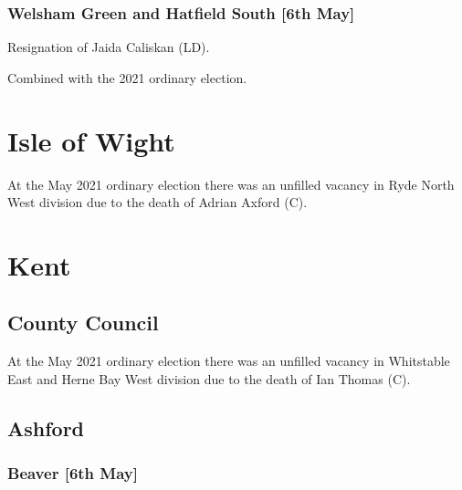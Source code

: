 \documentclass[a4paper,openany]{book}
\begin{document}
\begin{resultsiii}
\subsubsection*{Welsham Green and Hatfield South \hspace*{\fill}\nolinebreak[1]%
	\enspace\hspace*{\fill}
	[6th May]}


Resignation of Jaida Caliskan (LD).

Combined with the 2021 ordinary election.

\section{Isle of Wight}

At the May 2021 ordinary election there was an unfilled vacancy in Ryde North West division due to the death of Adrian Axford (C).

\section{Kent}

\subsection*{County Council}

At the May 2021 ordinary election there was an unfilled vacancy in Whitstable East and Herne Bay West division due to the death of Ian Thomas (C).

\subsection*{Ashford}

\subsubsection*{Beaver \hspace*{\fill}\nolinebreak[1]%
	\enspace\hspace*{\fill}
	[6th May]}



\end{resultsiii}
\end{document}
